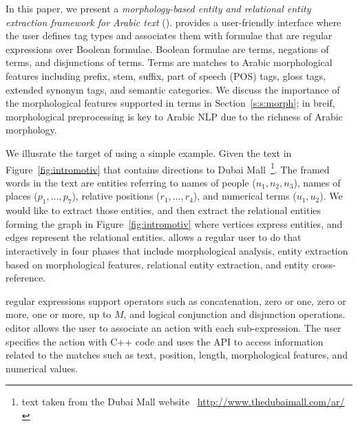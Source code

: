


In this paper, 
we present a {\em morphology-based entity and relational entity
extraction framework for Arabic text } (\framework). 
\framework provides a user-friendly interface where the user defines tag types 
and associates them with \framework formulae that are regular expressions over 
\framework Boolean formulae. 
Boolean formulae are terms, negations of terms, and disjunctions of terms. 
Terms are matches to Arabic morphological features including 
prefix, stem, suffix, part of speech (POS) tags, gloss tags, extended synonym tags, 
and semantic categories. 
We discuss the importance of the morphological features supported in 
\framework terms in Section~\ref{s:s:morph}; in breif, morphological preprocessing
is key to Arabic NLP due to the richness of Arabic morphology. 

We illusrate the target of \framework using a simple example. 
Given the text in Figure~\ref{fig:intromotiv} that contains
directions to Dubai Mall~\footnote{text taken from the Dubai Mall website
~\url{http://www.thedubaimall.com/ar/}}.
The framed words in the text are entities referring to names of people 
($n_1,n_2,n_3$), 
names of places ($p_1,\dots,p_7$), 
relative positions ($r_1,\dots,r_4$), 
and numerical terms ($u_1,u_2$). 
We would like to extract those entities, and then extract
the relational entities forming the graph in Figure~\ref{fig:intromotiv} 
where vertices express entities, 
and edges represent the relational entities.
\framework allows a regular user to do that interactively
in four phases that include morphological analysis, 
entity extraction based on morphological features, 
relational entity extraction, and entity cross-reference.

\framework regular expressions support operators such as concatenation, 
zero or one, zero or more, one or more, up to $M$, and logical 
conjunction and disjunction operations. 
\framework editor allows the user to associate an action with each 
\framework sub-expression. 
The user specifies the action with C++ code and uses the 
\framework API to access information related to 
the matches such as text, position, length, morphological features, 
and numerical values.


